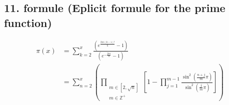 \subsection{11. formule (Eplicit formule for the prime function)}

\begin{align}
        \pi(x) &= \sum_{k=2}^x \frac{\left(e^{\frac{2\pi i
        (k-1)!}{k}}-1\right)}{\left(e^{-\frac{2\pi i}{n}}-1\right)} \\
        & = \sum_{n=2}^x \left(\prod_{\substack{m\in [2, \sqrt{n}]
        \\ m \in \mathbb{Z}^+}} \left[ 1- \prod_{j=1}^{m-1}\frac{
        \sin^2\left(\frac{n+j}{m}\pi\right)}{\sin^2\left(\frac{j}{m}
        \pi\right)}\right]\right)
\end{align}
